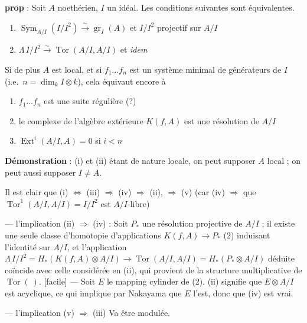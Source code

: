 \documentclass[11pt,a4paper]{article}
\begin{document}
\textbf{prop} : Soit $A$ noethérien, $I$ un idéal. Les conditions suivantes
sont équivalentes.
\begin{enumerate}
  \item[(i)] $\operatorname{Sym}_{A/I}(I/I^2) \xrightarrow{\sim} \operatorname{gr}_I(A)$
    et $I/I^2$ projectif sur $A/I$
  \item[(ii)] $\Lambda\, I/I^2 \xrightarrow{\sim} \operatorname{Tor}(A/I, A/I)$
    et \emph{idem}
\end{enumerate}
Si de plus $A$ est local, et si $f_1 \dots f_n$ est un système minimal de
générateurs de $I$ (i.e.\ $n = \dim_k I \otimes k$), cela équivaut encore à
\begin{enumerate}
  \item[(iii)] $f_1 \dots f_n$ est une suite régulière \struck{\ill{}} (?)
  \item[(iv)] le complexe de l'algèbre extérieure $K(f, A)$ est une résolution
    de $A/I$
  \item[(v)] $\operatorname{Ext}^i(A/I, A) = 0$ si $i < n$
\end{enumerate}

\textbf{Démonstration} : (i) et (ii) étant de nature locale, on peut supposer
$A$ local ; on peut aussi supposer $I \neq A$.

Il est clair que (i) $\Longleftrightarrow$ (iii) $\Longrightarrow$ (iv)
$\Longrightarrow$ (ii), $\Longrightarrow$ (v) (car (iv) $\Rightarrow$ que
$\operatorname{Tor}^1(A/I, A/I) = I/I^2$ est $A/I$-libre)

— l'implication (ii) $\Rightarrow$ (iv) : Soit $P_*$ une résolution projective
de $A/I$ ; il existe une seule classe d'homotopie d'applications
$K(f, A) \to P_*$ (2) induisant l'identité sur $A/I$, et l'application
$\Lambda\, I/I^2 = H_*(K(f, A) \otimes A/I) \to \operatorname{Tor}(A/I, A/I) = H_*(P_* \otimes A/I)$
déduite coïncide avec celle considérée en (ii), qui provient de la structure
multiplicative de $\operatorname{Tor}(\ )$. [facile] — Soit $E$ le mapping
cylinder de (2). (ii) signifie que $E \otimes A/I$ est acyclique, ce qui
implique par Nakayama que $E$ l'est, donc que (iv) est vrai.

— l'implication (v) $\Rightarrow$ (iii) Va être modulée.
\end{document}
